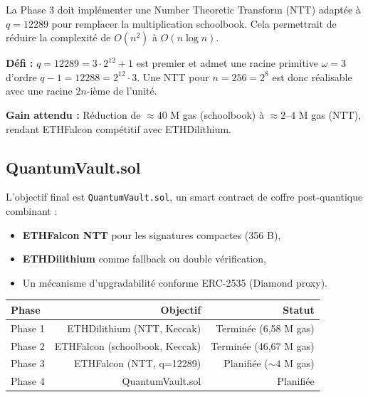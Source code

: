 \documentclass[11pt,a4paper]{article}
\begin{document}
La Phase 3 doit implémenter une Number Theoretic Transform (NTT) adaptée
à $q = 12289$ pour remplacer la multiplication schoolbook. Cela permettrait
de réduire la complexité de $O(n^2)$ à $O(n \log n)$.

\textbf{Défi :} $q = 12289 = 3 \cdot 2^{12} + 1$ est premier et admet une
racine primitive $\omega = 3$ d'ordre $q-1 = 12288 = 2^{12} \cdot 3$. Une
NTT pour $n=256 = 2^8$ est donc réalisable avec une racine $2n$-ième de l'unité.

\textbf{Gain attendu :} Réduction de $\approx 40$ M gas (schoolbook) à
$\approx 2$--4 M gas (NTT), rendant ETHFalcon compétitif avec ETHDilithium.

\subsection{QuantumVault.sol}

L'objectif final est \texttt{QuantumVault.sol}, un smart contract de coffre
post-quantique combinant :
\begin{itemize}
  \item \textbf{ETHFalcon NTT} pour les signatures compactes (356 B),
  \item \textbf{ETHDilithium} comme fallback ou double vérification,
  \item Un mécanisme d'upgradabilité conforme ERC-2535 (Diamond proxy).
\end{itemize}

\begin{center}
\begin{tabular}{lrr}
\toprule
Phase & Objectif & Statut \\
\midrule
Phase 1 & ETHDilithium (NTT, Keccak)     & Terminée (6,58 M gas) \\
Phase 2 & ETHFalcon (schoolbook, Keccak)  & Terminée (46,67 M gas) \\
Phase 3 & ETHFalcon (NTT, q=12289)        & Planifiée ($\sim 4$ M gas) \\
Phase 4 & QuantumVault.sol                & Planifiée \\
\bottomrule
\end{tabular}
\end{center}
\end{document}
